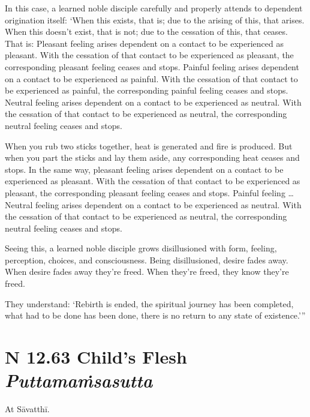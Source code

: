\documentclass[12pt,openany]{book}%
\newcommand*{\suttatitleacronym}[1]{\smaller[2]{#1}\vspace*{.3em}}
\newcommand*{\suttatitletranslation}[1]{\linebreak{#1}}
\newcommand*{\suttatitleroot}[1]{\linebreak\smaller[2]\itshape{#1}}
\newcommand*{\tocacronym}[1]{\hspace*{-3.3em}{#1}\quad}
\newcommand*{\toctranslation}[1]{#1}
\newcommand*{\tocroot}[1]{(\textit{#1})}
\begin{document}
In this case, a learned noble disciple carefully and properly attends to dependent origination itself: ‘When this exists, that is; due to the arising of this, that arises. When this doesn’t exist, that is not; due to the cessation of this, that ceases. That is: Pleasant feeling arises dependent on a contact to be experienced as pleasant. With the cessation of that contact to be experienced as pleasant, the corresponding pleasant feeling ceases and stops. Painful feeling arises dependent on a contact to be experienced as painful. With the cessation of that contact to be experienced as painful, the corresponding painful feeling ceases and stops. Neutral feeling arises dependent on a contact to be experienced as neutral. With the cessation of that contact to be experienced as neutral, the corresponding neutral feeling ceases and stops. 

When you rub two sticks together, heat is generated and fire is produced. But when you part the sticks and lay them aside, any corresponding heat ceases and stops. In the same way, pleasant feeling arises dependent on a contact to be experienced as pleasant. With the cessation of that contact to be experienced as pleasant, the corresponding pleasant feeling ceases and stops. Painful feeling … Neutral feeling arises dependent on a contact to be experienced as neutral. With the cessation of that contact to be experienced as neutral, the corresponding neutral feeling ceases and stops. 

Seeing this, a learned noble disciple grows disillusioned with form, feeling, perception, choices, and consciousness. Being disillusioned, desire fades away. When desire fades away they’re freed. When they’re freed, they know they’re freed. 

They understand: ‘Rebirth is ended, the spiritual journey has been completed, what had to be done has been done, there is no return to any state of existence.’” 

%
\section*{{\suttatitleacronym SN 12.63}{\suttatitletranslation A Child’s Flesh }{\suttatitleroot Puttamaṁsasutta}}
\addcontentsline{toc}{section}{\tocacronym{SN 12.63} \toctranslation{A Child’s Flesh } \tocroot{Puttamaṁsasutta}}

At \textsanskrit{Sāvatthī}. 
\end{document}
